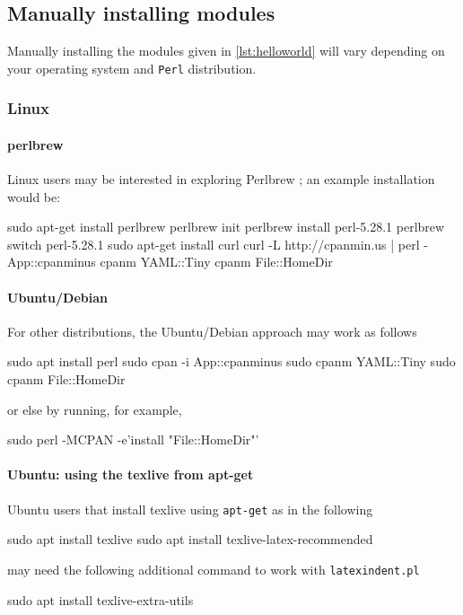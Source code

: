  \subsection{Manually installing modules}\label{sec:manual-module-instal}
  Manually installing the modules given in \cref{lst:helloworld} will vary depending on
  your operating system and \texttt{Perl} distribution.

 \subsubsection{Linux}
  \paragraph{perlbrew}
   Linux users may be interested in exploring Perlbrew \cite{perlbrew}; an example
   installation would be:
   \begin{commandshell}
sudo apt-get install perlbrew
perlbrew init
perlbrew install perl-5.28.1
perlbrew switch perl-5.28.1
sudo apt-get install curl
curl -L http://cpanmin.us | perl - App::cpanminus
cpanm YAML::Tiny
cpanm File::HomeDir
\end{commandshell}

  \paragraph{Ubuntu/Debian}
   For other distributions, the Ubuntu/Debian approach may work as follows
   \begin{commandshell}
sudo apt install perl
sudo cpan -i App::cpanminus
sudo cpanm YAML::Tiny
sudo cpanm File::HomeDir
\end{commandshell}
   or else by running, for example,
   \begin{commandshell}
sudo perl -MCPAN -e'install "File::HomeDir"'
\end{commandshell}

  \paragraph{Ubuntu: using the texlive from apt-get}
   Ubuntu users that install texlive using \texttt{apt-get} as in the following
   \begin{commandshell}
sudo apt install texlive
sudo apt install texlive-latex-recommended
\end{commandshell}
   may need the following additional command to work with \texttt{latexindent.pl}
   \begin{commandshell}
sudo apt install texlive-extra-utils 
\end{commandshell}
